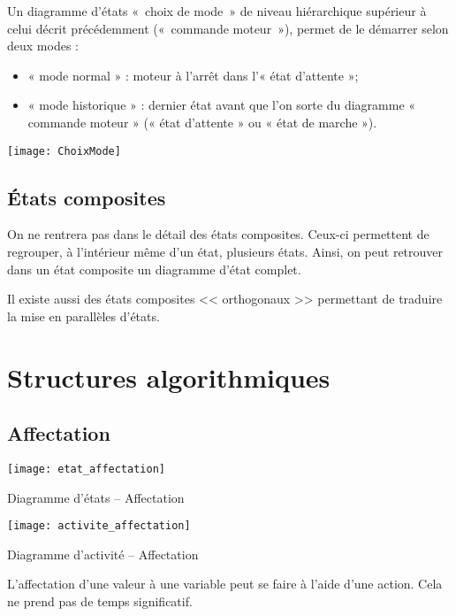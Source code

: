 \begin{exemple}

Un diagramme d’états «~choix de mode~» de niveau hiérarchique supérieur à celui décrit précédemment («~commande moteur~»), permet de le démarrer selon deux modes :
\begin{itemize}
\item « mode normal » : moteur à l’arrêt dans l’« état d’attente »;
\item « mode historique » : dernier état avant que l’on sorte du diagramme « commande moteur » (« état d’attente » ou « état de marche »).
\end{itemize}

\begin{center}
\texttt{[image: ChoixMode]}
\end{center}
\end{exemple}

\subsection{États composites}
On ne rentrera pas dans le détail des états composites. Ceux-ci permettent de regrouper, à l'intérieur même d'un état, plusieurs états. Ainsi, on peut retrouver dans un état composite un diagramme d'état complet.

Il existe aussi des états composites << orthogonaux >> permettant de traduire la mise en parallèles d'états. 

\clearpage

\section{Structures algorithmiques}
\subsection{Affectation}
\begin{marginfigure}
\texttt{[image: etat\_affectation]}
\caption{Diagramme d'états -- Affectation}
\end{marginfigure}

\begin{marginfigure} 
\texttt{[image: activite\_affectation]}
\caption{Diagramme d'activité -- Affectation}
\end{marginfigure}


L’affectation d’une valeur à une variable peut se faire à l’aide d’une action. Cela ne prend pas
de temps significatif.

